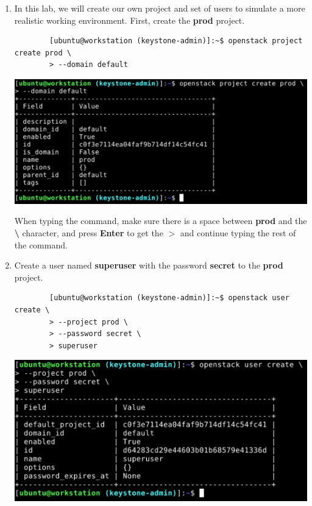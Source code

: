 \documentclass[letterpaper, 12pt]{article}
\begin{document}
\begin{enumerate}
    \item In this lab, we will create our own project and set of users to simulate a more realistic working environment.
    First, create the \textbf{prod} project.
    \begin{lstlisting}
        [ubuntu@workstation (keystone-admin)]:~$ openstack project create prod \
        > --domain default
    \end{lstlisting}

    \begin{center}
        \includegraphics[width=\linewidth]{images/part1/step4.png}
    \end{center}

    \begin{tipbox}
        When typing the command, make sure there is a space between \textbf{prod} and the \textbf{\textbackslash}
        character, and press \textbf{Enter} to get the \textbf{$>$} and continue typing the rest of the command.
    \end{tipbox}

    \item Create a user named \textbf{superuser} with the password \textbf{secret} to the \textbf{prod} project.
    \begin{lstlisting}
        [ubuntu@workstation (keystone-admin)]:~$ openstack user create \
        > --project prod \
        > --password secret \
        > superuser
    \end{lstlisting}

    \begin{center}
        \includegraphics[width=\linewidth]{images/part1/step5.png}
    \end{center}


\end{enumerate}
\end{document}
